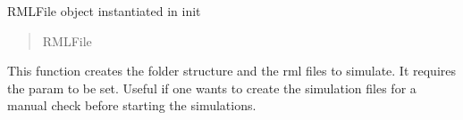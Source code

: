 \documentclass[letterpaper,10pt,english]{sphinxmanual}
\begin{document}
\begin{fulllineitems}
\begin{fulllineitems}
\begin{quote}
\begin{description}
\end{description}\end{quote}

\end{fulllineitems}


\begin{fulllineitems}
\label{\detokenize{index:raypyng.simulate.Simulate.rml}}
\pysigstartsignatures
{}
\pysigstopsignatures
\sphinxAtStartPar
RMLFile object instantiated in init
\begin{quote}\begin{description}
\sphinxAtStartPar
RMLFile

\end{description}\end{quote}

\end{fulllineitems}


\begin{fulllineitems}
\label{\detokenize{index:raypyng.simulate.Simulate.rml_list}}
\pysigstartsignatures
{}
\pysigstopsignatures
\sphinxAtStartPar
This function creates the folder structure and the rml files to simulate.
It requires the param to be set. Useful if one wants to create the simulation files
for a manual check before starting the simulations.

\end{fulllineitems}



\end{fulllineitems}
\end{document}
